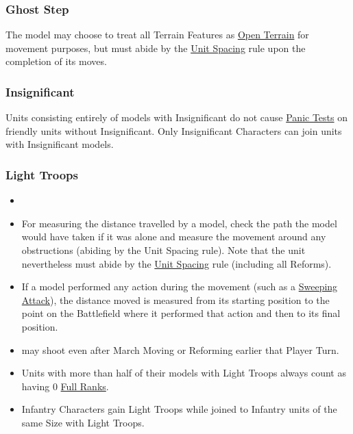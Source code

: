 \subsubsection{Ghost Step}
\label{ghost_step}

The model may choose to treat all Terrain Features as \hyperref[open_terrain]{Open Terrain} for movement purposes, but must abide by the \hyperref[unit_spacing]{Unit Spacing} rule upon the completion of its moves.

\subsubsection{Insignificant}
\label{insignificant}

Units consisting entirely of models with Insignificant do not cause \hyperref[panic_test]{Panic Tests} on friendly units without Insignificant. Only Insignificant Characters can join units with Insignificant \rnf{} models.

\subsubsection{Light Troops}
\label{light_troops}


\begin{itemize}[label={-}]
\item {}
\item For measuring the distance travelled by a model, check the path the model would have taken if it was alone and measure the movement around any obstructions (abiding by the Unit Spacing rule). Note that the unit nevertheless must abide by the \hyperref[unit_spacing]{Unit Spacing} rule (including all Reforms).
\item If a model performed any action during the movement (such as a \hyperref[sweeping_attack]{Sweeping Attack}), the distance moved is measured from its starting position to the point on the Battlefield where it performed that action and then to its final position.
\end{itemize}

\begin{itemize}[label={-}]
\item {} may shoot even after March Moving or Reforming earlier that Player Turn.
\item Units with more than half of their models with Light Troops always count as having 0 \hyperref[full_ranks]{Full Ranks}.
\item Infantry Characters gain Light Troops while joined to Infantry units of the same Size with Light Troops.
\end{itemize}

